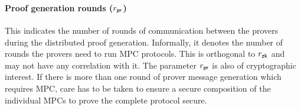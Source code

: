 \paragraph{Proof generation rounds ($r_\mathsf{pr}$)}
This indicates the number of rounds of communication between the provers during
the distributed proof generation. Informally, it denotes the number of rounds the provers need to run MPC protocols. %
 This is orthogonal  to $r_\mathsf{zk}$ and may not have any correlation with it. %
The parameter $r_\mathsf{pr}$ is also of cryptographic interest. If there is more than one round of prover message generation which requires MPC, care has to be taken to ensure a secure composition of the individual MPCs to prove the complete protocol secure.


